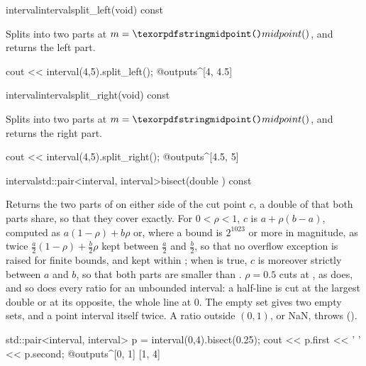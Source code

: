 \begin{defmethod}{interval}{interval}{split\_left}{(void) const}
  \begin{operation}
  \end{operation}
  Splits  into two parts at $m=\code{midpoint()}$, and returns
  the left part.
  \begin{example}
cout << interval(4,5).split_left();
@outputs^[4, 4.5]~
  \end{example}
\end{defmethod}

\begin{defmethod}{interval}{interval}{split\_right}{(void) const}
  \begin{operation}
  \end{operation}
  Splits  into two parts at $m=\code{midpoint()}$, and returns
  the right part.
  \begin{example}
cout << interval(4,5).split_right();
@outputs^[4.5, 5]~
  \end{example}
\end{defmethod}

\begin{defmethod}{interval}{std::pair<interval, interval>}{bisect}{(double ) const}
  \begin{operation}
  \end{operation}
  Returns the two parts of  on either side of the cut point $c$,
  a double of  that both parts share, so that they cover
   exactly. For $0<\rho<1$, $c$ is $a+\rho(b-a)$, computed as
  $a(1-\rho)+b\rho$ or, where a bound is $2^{1023}$ or more in magnitude, as
  twice $\frac{a}{2}(1-\rho)+\frac{b}{2}\rho$ kept between $\frac{a}{2}$ and
  $\frac{b}{2}$, so that no overflow exception is raised for finite bounds, and
  kept within ;
  when  is true, $c$ is moreover strictly between
  $a$ and $b$, so that both parts are smaller than . $\rho=0.5$
  cuts at , as  does, and so does every
  ratio for an unbounded interval: a half-line is cut at the largest double
  or at its opposite, the whole line at $0$. The empty set gives two empty
  sets, and a point interval itself twice. A ratio outside $(0,1)$, or NaN,
  throws  ().\newinvfive
  \begin{example}
std::pair<interval, interval> p = interval(0,4).bisect(0.25);
cout << p.first << ' ' << p.second;
@outputs^[0, 1] [1, 4]~
  \end{example}
\end{defmethod}

